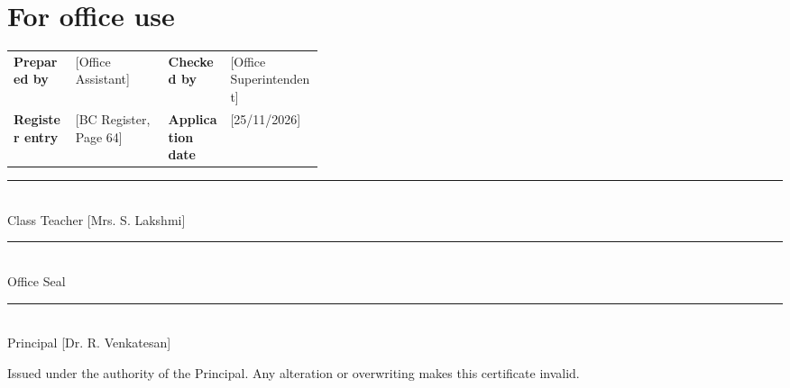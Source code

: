 \documentclass[10pt]{article}
\begin{document}
\section{For office use}

\begin{tabularx}{\linewidth}{@{}p{0.2\linewidth}X p{0.2\linewidth}X@{}}
\textbf{Prepared by} & [Office Assistant] & \textbf{Checked by} & [Office Superintendent] \\
\textbf{Register entry} & [BC Register, Page 64] & \textbf{Application date} & [25/11/2026] \\
\end{tabularx}\par\vspace{2pt}

\vspace{36pt}

\vspace{32pt}\noindent\parbox[t]{0.3\linewidth}{\centering\rule{\linewidth}{0.5pt}\\ Class Teacher
[Mrs. S. Lakshmi]}\hfill\parbox[t]{0.3\linewidth}{\centering\rule{\linewidth}{0.5pt}\\ Office Seal}\hfill\parbox[t]{0.3\linewidth}{\centering\rule{\linewidth}{0.5pt}\\ Principal
[Dr. R. Venkatesan]}\par

\vspace{14pt}

Issued under the authority of the Principal. Any alteration or overwriting makes this certificate invalid.\par\vspace{4pt}
\end{document}
